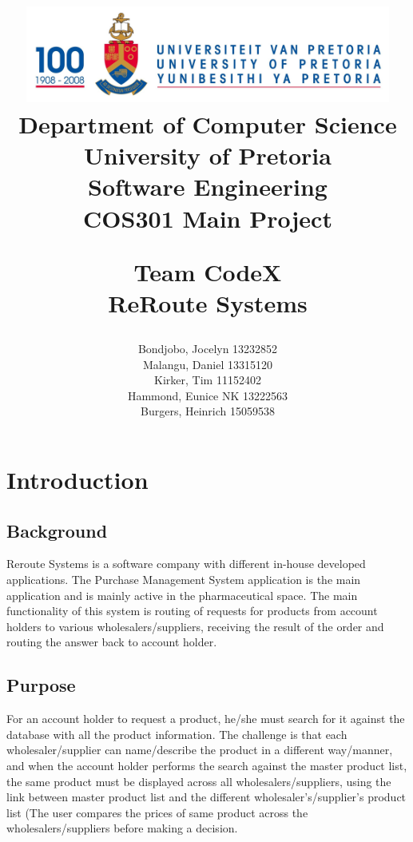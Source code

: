 \documentclass[a4paper,10pt]{article}
\title{\includegraphics[width=12cm]{Eeufeeslogo.jpg} \\
       Department of Computer Science \\
       University of Pretoria \\
       \vspace{0.5cm}
       Software Engineering\\
       COS301 Main Project \\
       \vspace{0.5cm}
       \begin{large} \textbf{Team CodeX}\\ ReRoute Systems\end{large}}
\date{}
\author{	Bondjobo, Jocelyn 		13232852 		\\
		Malangu, Daniel		13315120		\\
		Kirker, Tim			11152402		\\
		Hammond, Eunice	NK	13222563		\\
		Burgers, Heinrich		15059538		\\
}
\begin{document}
\maketitle
\thispagestyle{empty}
\clearpage

\newpage
{}
\thispagestyle{empty}
\tableofcontents
\clearpage

\newpage
{}

\section{Introduction}

	\subsection{Background} 
	Reroute Systems is a software company with different in-house developed applications. The Purchase Management System application is the main application and is mainly active in the pharmaceutical space. The main functionality of this system is routing of requests for products from account holders to various wholesalers/suppliers, receiving the result of the order and routing the answer back to account holder.
	
	\subsection{Purpose} 	
	For an account holder to request a product, he/she must search for it against the database with all the product information. The challenge is that each wholesaler/supplier can name/describe the product in a different way/manner, and when the account holder performs the search against the master product list, the same product must be displayed across all wholesalers/suppliers, using the link between master product list and the different wholesaler's/supplier's product list (The user compares the prices of same product across the wholesalers/suppliers before making a decision.
\end{document}
